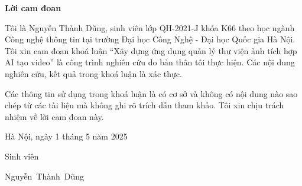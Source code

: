 \setcounter{page}{1}
\begin{center}
	\textbf{\large{Lời cam đoan}	}
\end{center}
Tôi là Nguyễn Thành Dũng, sinh viên lớp QH-2021-J khóa K66 theo học ngành Công nghệ thông tin tại trường Đại học Công Nghệ - Đại học Quốc gia Hà Nội. Tôi xin cam đoan khoá luận ``Xây dựng ứng dụng quản lý thư viện ảnh tích hợp AI tạo video'' là công trình nghiên cứu do bản thân tôi thực hiện. Các nội dung nghiên cứu, kết quả trong khoá luận là xác thực.

Các thông tin sử dụng trong khoá luận là có cơ sở và không có nội dung nào sao chép từ các tài liệu mà không ghi rõ trích dẫn tham khảo. Tôi xin chịu trách nhiệm về lời cam đoan này.

\begin{flushright}
	Hà Nội, ngày 1 tháng 5 năm 2025
\end{flushright}

\begin{changemargin}{12cm}{2cm}
	Sinh viên
	\\[2cm]
\end{changemargin}

\begin{changemargin}{11cm}{2cm}
	\begin{center}
		Nguyễn~Thành~Dũng
	\end{center}
\end{changemargin}